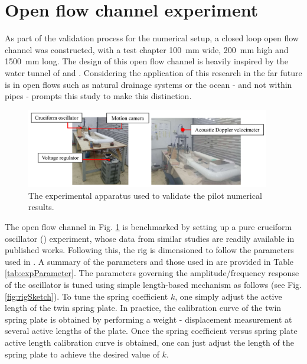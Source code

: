 \documentclass[oneside]{utmthesis}
\begin{document}
\section{Open flow channel experiment} \label{sec:openFlowExp}

As part of the validation process for the numerical setup, a closed loop open flow channel was constructed, with a test chapter \SI{100}{\milli\metre} wide, \SI{200}{\milli\metre} high and \SI{1500}{\milli\metre} long. The design of this open flow channel is heavily inspired by the water tunnel of \citet{Nguyen2012} and \citet{Koide2013}. Considering the application of this research in the far future is in open flows such as natural drainage systems or the ocean - and not within pipes - prompts this study to make this distinction.

\begin{figure}[!h]
  \centering
  \hspace{1cm} \includegraphics[width=0.95\textwidth]{figs/actualApparatus}
  \caption{The experimental apparatus used to validate the pilot numerical results.}
  \label{fig:actual apparatus}
\end{figure}

The open flow channel in Fig. \ref{fig:actual apparatus} is benchmarked by setting up a pure cruciform oscillator (\angfi{}) experiment, whose data from similar studies are readily available in published works. Following this, the rig is dimensioned to follow the parameters used in \citet{Koide2013}. A summary of the parameters and those used in \citet{Koide2013} are provided in Table \ref{tab:expParameter}. The parameters governing the amplitude/frequency response of the oscillator is tuned using simple length-based mechanism as follows (see Fig. \ref{fig:rigSketch}). To tune the spring coefficient $k$, one simply adjust the active length of the twin spring plate. In practice, the calibration curve of the twin spring plate is obtained by performing a weight - displacement measurement \citep{Sun2016} at several active lengths of the plate. Once the spring coefficient versus spring plate active length calibration curve is obtained, one can just adjust the length of the spring plate to achieve the desired value of $k$.
\end{document}
